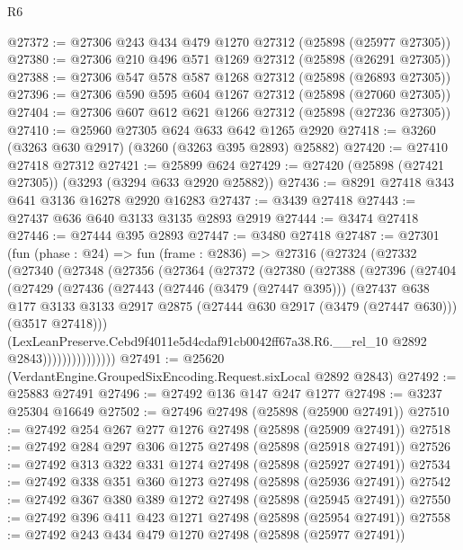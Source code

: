 \begin{lexlean}{R6}
\begin{coremodule}
@27372 := @27306 @243 @434 @479 @1270 @27312 (@25898 (@25977 @27305))
@27380 := @27306 @210 @496 @571 @1269 @27312 (@25898 (@26291 @27305))
@27388 := @27306 @547 @578 @587 @1268 @27312 (@25898 (@26893 @27305))
@27396 := @27306 @590 @595 @604 @1267 @27312 (@25898 (@27060 @27305))
@27404 := @27306 @607 @612 @621 @1266 @27312 (@25898 (@27236 @27305))
@27410 := @25960 @27305 @624 @633 @642 @1265 @2920
@27418 := @3260 (@3263 @630 @2917) (@3260 (@3263 @395 @2893) @25882)
@27420 := @27410 @27418 @27312
@27421 := @25899 @624
@27429 := @27420 (@25898 (@27421 @27305)) (@3293 (@3294 @633 @2920 @25882))
@27436 := @8291 @27418 @343 @641 @3136 @16278 @2920 @16283
@27437 := @3439 @27418
@27443 := @27437 @636 @640 @3133 @3135 @2893 @2919
@27444 := @3474 @27418
@27446 := @27444 @395 @2893
@27447 := @3480 @27418
@27487 := @27301
    (fun (phase : @24) =>
    fun (frame : @2836) =>
    @27316
      (@27324
        (@27332
          (@27340
            (@27348
              (@27356
                (@27364
                  (@27372
                    (@27380
                      (@27388
                        (@27396
                          (@27404
                            (@27429
                              (@27436
                                (@27443
                                  (@27446 (@3479 (@27447 @395)))
                                  (@27437
                                    @638
                                    @177
                                    @3133
                                    @3133
                                    @2917
                                    @2875
                                    (@27444 @630 @2917 (@3479 (@27447 @630)))
                                    (@3517 @27418)))
                                (LexLeanPreserve.Cebd9f4011e5d4cdaf91cb0042ff67a38.R6.__rel_10
                                  @2892
                                  @2843)))))))))))))))
@27491 := @25620 (VerdantEngine.GroupedSixEncoding.Request.sixLocal @2892 @2843)
@27492 := @25883 @27491
@27496 := @27492 @136 @147 @247 @1277
@27498 := @3237 @25304 @16649
@27502 := @27496 @27498 (@25898 (@25900 @27491))
@27510 := @27492 @254 @267 @277 @1276 @27498 (@25898 (@25909 @27491))
@27518 := @27492 @284 @297 @306 @1275 @27498 (@25898 (@25918 @27491))
@27526 := @27492 @313 @322 @331 @1274 @27498 (@25898 (@25927 @27491))
@27534 := @27492 @338 @351 @360 @1273 @27498 (@25898 (@25936 @27491))
@27542 := @27492 @367 @380 @389 @1272 @27498 (@25898 (@25945 @27491))
@27550 := @27492 @396 @411 @423 @1271 @27498 (@25898 (@25954 @27491))
@27558 := @27492 @243 @434 @479 @1270 @27498 (@25898 (@25977 @27491))

\end{coremodule}
\end{lexlean}
